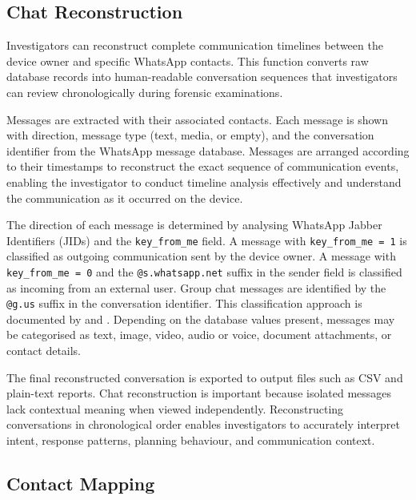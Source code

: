 \documentclass[12pt,a4paper]{report}
\begin{document}
\subsection{Chat Reconstruction}

Investigators can reconstruct complete communication timelines between the device owner and specific WhatsApp contacts. This function converts raw database records into human-readable conversation sequences that investigators can review chronologically during forensic examinations.

Messages are extracted with their associated contacts. Each message is shown with direction, message type (text, media, or empty), and the conversation identifier from the WhatsApp message database. Messages are arranged according to their timestamps to reconstruct the exact sequence of communication events, enabling the investigator to conduct timeline analysis effectively and understand the communication as it occurred on the device.

The direction of each message is determined by analysing WhatsApp Jabber Identifiers (JIDs) and the \texttt{key\_from\_me} field. A message with \texttt{key\_from\_me = 1} is classified as outgoing communication sent by the device owner. A message with \texttt{key\_from\_me = 0} and the \texttt{@s.whatsapp.net} suffix in the sender field is classified as incoming from an external user. Group chat messages are identified by the \texttt{@g.us} suffix in the conversation identifier. This classification approach is documented by \citet{anglano2014} and \citet{lekhac2022book}. Depending on the database values present, messages may be categorised as text, image, video, audio or voice, document attachments, or contact details.

The final reconstructed conversation is exported to output files such as CSV and plain-text reports. Chat reconstruction is important because isolated messages lack contextual meaning when viewed independently. Reconstructing conversations in chronological order enables investigators to accurately interpret intent, response patterns, planning behaviour, and communication context.

\subsection{Contact Mapping}
\end{document}
